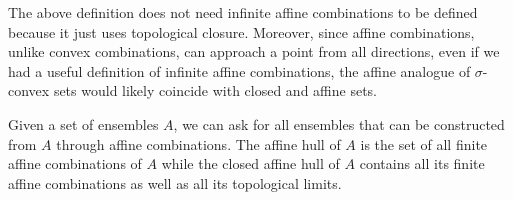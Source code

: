 \begin{mathSection}
	\begin{remark}
		The above definition does not need infinite affine combinations to be defined because it just uses topological closure. Moreover, since affine combinations, unlike convex combinations, can approach a point from all directions, even if we had a useful definition of infinite affine combinations, the affine analogue of $\sigma$-convex sets would likely coincide with closed and affine sets.
	\end{remark}
\end{mathSection}

Given a set of ensembles $A$, we can ask for all ensembles that can be constructed from $A$ through affine combinations. The affine hull of $A$ is the set of all finite affine combinations of $A$ while the closed affine hull of $A$ contains all its finite affine combinations as well as all its topological limits.

